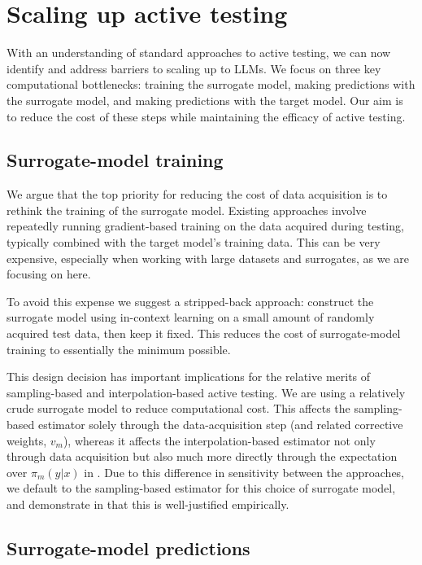 \section{Scaling up active testing}\label{sec:scaling_method}

With an understanding of standard approaches to active testing, we can now identify and address barriers to scaling up to LLMs.
We focus on three key computational bottlenecks: training the surrogate model, making predictions with the surrogate model, and making predictions with the target model.
Our aim is to reduce the cost of these steps while maintaining the efficacy of active testing.


\subsection{Surrogate-model training}\label{sec:surrogate_training}

We argue that the top priority for reducing the cost of data acquisition is to rethink the training of the surrogate model.
Existing approaches involve repeatedly running gradient-based training on the data acquired during testing, typically combined with the target model's training data.
This can be very expensive, especially when working with large datasets and surrogates, as we are focusing on here.

To avoid this expense we suggest a stripped-back approach: construct the surrogate model using in-context learning \citep{brown2020language} on a small amount of randomly acquired test data, then keep it fixed.
This reduces the cost of surrogate-model training to essentially the minimum possible.

This design decision has important implications for the relative merits of sampling-based and interpolation-based active testing.
We are using a relatively crude surrogate model to reduce computational cost.
This affects the sampling-based estimator solely through the data-acquisition step (and related corrective weights, $v_m$), whereas it affects the interpolation-based estimator not only through data acquisition but also much more directly through the expectation over $\pi_m(y|x)$ in .
Due to this difference in sensitivity between the approaches, we default to the sampling-based estimator for this choice of surrogate model, and demonstrate in  that this is well-justified empirically.


\subsection{Surrogate-model predictions}\label{sec:surrogate_prediction}

